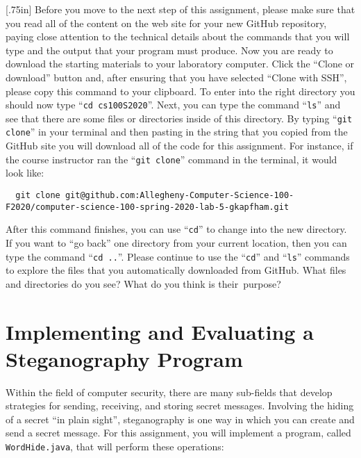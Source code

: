 \documentclass[11pt]{article}
\newcommand{\command}[1]{``\lstinline{#1}''}
\newcommand{\step}[1]{``{#1}''}
\newcommand{\caution}[1]{\null\hfill\LARGE{\faWarning{}}\newline\scriptsize{\em{#1}}}
\begin{document}
\marginnote{\caution{Clone GitHub repository}}[.75in] Before you move to the
next step of this assignment, please make sure that you read all of the content
on the web site for your new GitHub repository, paying close attention to the
technical details about the commands that you will type and the output that your
program must produce. Now you are ready to download the starting materials to
your laboratory computer. Click the ``Clone or download'' button and, after
ensuring that you have selected ``Clone with SSH'', please copy this command to
your clipboard. To enter into the right directory you should now type
\command{cd cs100S2020}. Next, you can type the command \command{ls} and see
that there are some files or directories inside of this directory. By typing
\command{git clone} in your terminal and then pasting in the string that you
copied from the GitHub site you will download all of the code for this
assignment. For instance, if the course instructor ran the \command{git clone}
command in the terminal, it would look like:

\begin{lstlisting}
  git clone git@github.com:Allegheny-Computer-Science-100-F2020/computer-science-100-spring-2020-lab-5-gkapfham.git
\end{lstlisting}

After this command finishes, you can use \command{cd} to change into the new
directory. If you want to \step{go back} one directory from your current
location, then you can type the command \command{cd ..}. Please continue to use
the \command{cd} and \command{ls} commands to explore the files that you
automatically downloaded from GitHub. What files and directories do you see?
What do you think is \mbox{their purpose}?


\section*{Implementing and Evaluating a Steganography Program}

Within the field of computer security, there are many sub-fields that develop
strategies for sending, receiving, and storing secret messages. Involving the
hiding of a secret ``in plain sight'', steganography is one way in which you can
create and send a secret message. For this assignment, you will implement a
program, called {\tt WordHide.java}, that will perform these operations:
\end{document}

